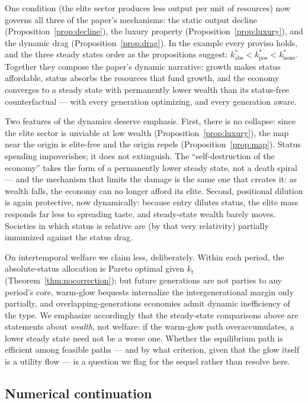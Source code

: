 \documentclass[12pt,letterpaper]{article}
\theoremstyle{definition}
\begin{document}
One condition (the elite sector produces less output per unit of resources) now governs all three of the paper's mechanisms: the static output decline (Proposition~\ref{prop:decline}), the luxury property (Proposition~\ref{prop:luxury}), and the dynamic drag (Proposition~\ref{prop:drag}).
In the example every proviso holds, and the three steady states order as the propositions suggest: $k^\ast_{\mathrm{abs}} < k^\ast_{\mathrm{pos}} < k^\ast_{\mathrm{none}}$.
Together they compose the paper's dynamic narrative: growth makes status affordable, status absorbs the resources that fund growth, and the economy converges to a steady state with permanently lower wealth than its status-free counterfactual --- with every generation optimizing, and every generation aware.

Two features of the dynamics deserve emphasis.
First, there is no collapse: since the elite sector is unviable at low wealth (Proposition~\ref{prop:luxury}), the map near the origin is elite-free and the origin repels (Proposition~\ref{prop:map}).
Status spending impoverishes; it does not extinguish.
The ``self-destruction of the economy'' takes the form of a permanently lower steady state, not a death spiral --- and the mechanism that limits the damage is the same one that creates it: as wealth falls, the economy can no longer afford its elite.
Second, positional dilution is again protective, now dynamically: because entry dilutes status, the elite mass responds far less to spreading taste, and steady-state wealth barely moves.
Societies in which status is relative are (by that very relativity) partially immunized against the status drag.

On intertemporal welfare we claim less, deliberately.
Within each period, the absolute-status allocation is Pareto optimal given $k_t$ (Theorem~\ref{thm:nocorrection}); but future generations are not parties to any period's core, warm-glow bequests \citep{andreoni1990} internalize the intergenerational margin only partially, and overlapping-generations economies admit dynamic inefficiency of the \citet{diamond1965} type.
We emphasize accordingly that the steady-state comparisons above are statements about \emph{wealth}, not welfare: if the warm-glow path overaccumulates, a lower steady state need not be a worse one.
Whether the equilibrium path is efficient among feasible paths --- and by what criterion, given that the glow itself is a utility flow --- is a question we flag for the sequel rather than resolve here.

\subsection{Numerical continuation}
\end{document}
